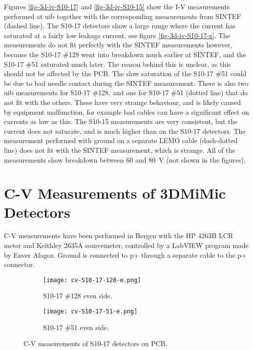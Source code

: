 \documentclass[../main/thesis.tex]{subfiles}
\begin{document}
Figures \ref{fig-3d-iv-S10-17} and \ref{fig-3d-iv-S10-15} show the I-V measurements performed at \gls{uib} together with the corresponding measurements from SINTEF (dashed line). The S10-17 detectors show a large range where the current has saturated at a fairly low leakage current, see figure \ref{fig-3d-iv-S10-17-z}. The measurements do not fit perfectly with the SINTEF measurements however, because the S10-17 \#128 went into breakdown much earlier at SINTEF, and the S10-17 \#51 saturated much later. The reason behind this is unclear, as this should not be affected by the \gls{PCB}. The slow saturation of the S10-17 \#51 could be due to bad needle contact during the SINTEF measurement. There is also two \gls{uib} measurements for S10-17 \#128, and one for S10-17 \#51 (dotted line) that do not fit with the others. These have very strange behaviour, and is likely caused by equipment malfunction, for example bad cables can have a significant effect on currents as low as this. The S10-15 measurements are very consistent, but the current does not saturate, and is much higher than on the S10-17 detectors. The measurement performed with ground on a separate LEMO cable (dash-dotted line) does not fit with the SINTEF measurement, which is strange. All of the measurements show breakdown between 60 and 80~V (not shown in the figures). 


\newpage
\section{C-V Measurements of 3DMiMic Detectors}

C-V measurements have been performed in Bergen with the HP 4263B LCR meter and Keithley 2635A sourcemeter, controlled by a LabVIEW program made by Enver Alagoz. Ground is connected to p+ through a separate cable to the p+ connector. 

\begin{figure}[h!]
	\centering
	\begin{subfigure}{.5\textwidth}
		\centering
		\texttt{[image: cv-S10-17-128-e.png]}
		\caption{S10-17 \#128 even side.}
		\label{fig-cv-S10-17-128-e}
	\end{subfigure}%
	\begin{subfigure}{.5\textwidth}
		\centering
		\texttt{[image: cv-S10-17-51-e.png]}
		\caption{S10-17 \#51 even side.}
		\label{fig-cv-S10-17-51-e} 
	\end{subfigure}
	\caption{C-V measurements of S10-17 detectors on PCB.}
	\label{fig-3d-cv-S10-17}
\end{figure}
\end{document}
